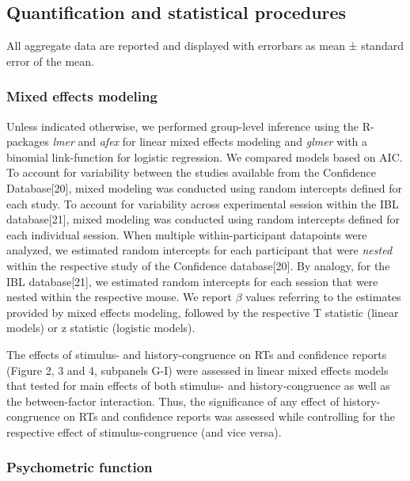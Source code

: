 \documentclass[
]{article}
\begin{document}
\hypertarget{quantification-and-statistical-procedures}{%
\subsection{Quantification and statistical
procedures}\label{quantification-and-statistical-procedures}}

All aggregate data are reported and displayed with errorbars as mean ±
standard error of the mean.

\hypertarget{mixed-effects-modeling}{%
\subsubsection{Mixed effects modeling}\label{mixed-effects-modeling}}

Unless indicated otherwise, we performed group-level inference using the
R-packages \emph{lmer} and \emph{afex} for linear mixed effects modeling
and \emph{glmer} with a binomial link-function for logistic regression.
We compared models based on AIC. To account for variability between the
studies available from the Confidence Database{[}20{]}, mixed modeling
was conducted using random intercepts defined for each study. To account
for variability across experimental session within the IBL
database{[}21{]}, mixed modeling was conducted using random intercepts
defined for each individual session. When multiple within-participant
datapoints were analyzed, we estimated random intercepts for each
participant that were \emph{nested} within the respective study of the
Confidence database{[}20{]}. By analogy, for the IBL database{[}21{]},
we estimated random intercepts for each session that were nested within
the respective mouse. We report \(\beta\) values referring to the
estimates provided by mixed effects modeling, followed by the respective
T statistic (linear models) or z statistic (logistic models).

The effects of stimulus- and history-congruence on RTs and confidence
reports (Figure 2, 3 and 4, subpanels G-I) were assessed in linear mixed
effects models that tested for main effects of both stimulus- and
history-congruence as well as the between-factor interaction. Thus, the
significance of any effect of history-congruence on RTs and confidence
reports was assessed while controlling for the respective effect of
stimulus-congruence (and vice versa).

\hypertarget{psychometric-function}{%
\subsubsection{Psychometric function}\label{psychometric-function}}
\end{document}
